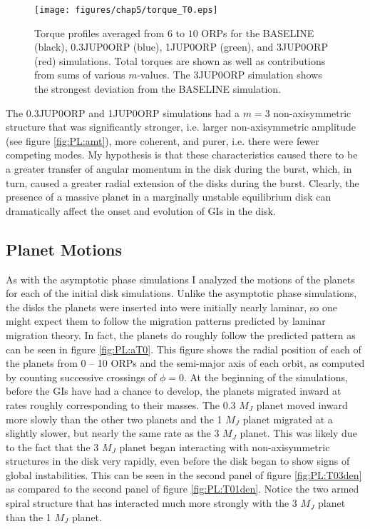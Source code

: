 \begin{figure}[p]
\centering
\texttt{[image: figures/chap5/torque\_T0.eps]}
\caption[NEED TAGLINE]{Torque profiles averaged from $6$ to $10$ ORPs for the BASELINE (black), 0.3JUP0ORP (blue), 1JUP0ORP (green), and 3JUP0ORP (red) simulations. Total torques are shown as well as contributions from sums of various $m$-values. The 3JUP0ORP simulation shows the strongest deviation from the BASELINE simulation.}
\label{fig:PL:torqueT0}
\end{figure}

The 0.3JUP0ORP and 1JUP0ORP simulations had a $m = 3$ non-axisymmetric structure that was significantly stronger, i.e. larger non-axisymmetric amplitude (see figure \ref{fig:PL:amt}), more coherent, and purer, i.e. there were fewer competing modes. My hypothesis is that these characteristics caused there to be a greater transfer of angular momentum in the disk during the burst, which, in turn, caused a greater radial extension of the disks during the burst. Clearly, the presence of a massive planet in a marginally unstable equilibrium disk can dramatically affect the onset and evolution of GIs in the disk.

\subsection{Planet Motions}\label{sec:PL:T0mig}

As with the asymptotic phase simulations I analyzed the motions of the planets for each of the initial disk simulations. Unlike the asymptotic phase simulations, the disks the planets were inserted into were initially nearly laminar, so one might expect them to follow the migration patterns predicted by laminar migration theory. In fact, the planets do roughly follow the predicted pattern as can be seen in figure \ref{fig:PL:aT0}. This figure shows the radial position of each of the planets from 0 -- 10 ORPs and the semi-major axis of each orbit, as computed by counting successive crossings of $\phi = 0$. At the beginning of the simulations, before the GIs have had a chance to develop, the planets migrated inward at rates roughly corresponding to their masses. The 0.3 $M_J$ planet moved inward more slowly than the other two planets and the 1 $M_J$ planet migrated at a slightly slower, but nearly the same rate as the 3 $M_J$ planet. This was likely due to the fact that the 3 $M_J$ planet began interacting with non-axisymmetric structures in the disk very rapidly, even before the disk began to show signs of global instabilities. This can be seen in the second panel of figure \ref{fig:PL:T03den} as compared to the second panel of figure \ref{fig:PL:T01den}. Notice the two armed spiral structure that has interacted much more strongly with the 3 $M_J$ planet than the 1 $M_J$ planet. 

